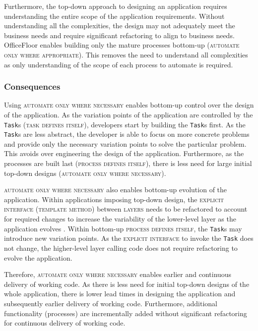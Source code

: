 \documentclass[prodmode]{style/acmlarge}
\begin{document}
Furthermore, the top-down approach to designing an application requires
understanding the entire scope of the application requirements.  Without
understanding all the complexities, the design may not adequately meet the
business needs and require significant refactoring to align to business needs. 
OfficeFloor enables building only the mature processes bottom-up
(\textsc{automate only where appropriate}).  This removes the need to understand
all complexities as only understanding of the scope of each process to automate
is required.


\subsubsection*{Consequences}

Using \textsc{automate only where necessary} enables bottom-up control over the
design of the application.  As the variation points of the application are
controlled by the \texttt{Task}s (\textsc{task defines itself}), developers
start by building the \texttt{Task}s first.  As the \texttt{Task}s are less
abstract, the developer is able to focus on more concrete problems and provide
only the necessary variation points to solve the particular problem.  This
avoids over engineering the design of the application.  Furthermore, as the
processes are built last (\textsc{process defines itself}), there is less need
for large initial top-down designs (\textsc{automate only where necessary}).

\textsc{automate only where necessary} also enables bottom-up evolution of the
application.  Within applications imposing top-down design, the
\textsc{explicit interface} (\textsc{template method}) between \textsc{layers}
needs to be refactored to account for required changes to increase the
variability of the lower-level layer as the application evolves \cite{ioc}.
Within bottom-up \textsc{process defines itself}, the \texttt{Task}s may
introduce new variation points.  As the \textsc{explicit interface} to invoke
the \texttt{Task} does not change, the higher-level layer calling code does not
require refactoring to evolve the application.

Therefore, \textsc{automate only where necessary} enables earlier and continuous
delivery of working code.  As there is less need for initial top-down designs of
the whole application, there is lower lead times in designing the application
and subsequently earlier delivery of working code.  Furthermore, additional
functionality (processes) are incrementally added without significant
refactoring for continuous delivery of working code.
\end{document}
